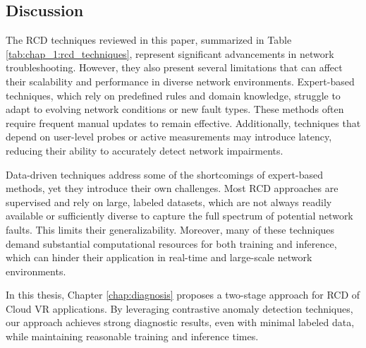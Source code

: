 \subsection{Discussion}


The RCD techniques reviewed in this paper, summarized in Table \ref{tab:chap_1:rcd_techniques}, represent significant advancements in network troubleshooting. However, they also present several limitations that can affect their scalability and performance in diverse network environments. Expert-based techniques, which rely on predefined rules and domain knowledge, struggle to adapt to evolving network conditions or new fault types. These methods often require frequent manual updates to remain effective. Additionally, techniques that depend on user-level probes or active measurements may introduce latency, reducing their ability to accurately detect network impairments.

Data-driven techniques address some of the shortcomings of expert-based methods, yet they introduce their own challenges. Most RCD approaches are supervised and rely on large, labeled datasets, which are not always readily available or sufficiently diverse to capture the full spectrum of potential network faults. This limits their generalizability. Moreover, many of these techniques demand substantial computational resources for both training and inference, which can hinder their application in real-time and large-scale network environments.

In this thesis, Chapter \ref{chap:diagnosis} proposes a two-stage approach for RCD of Cloud VR applications. By leveraging contrastive anomaly detection techniques, our approach achieves strong diagnostic results, even with minimal labeled data, while maintaining reasonable training and inference times.



